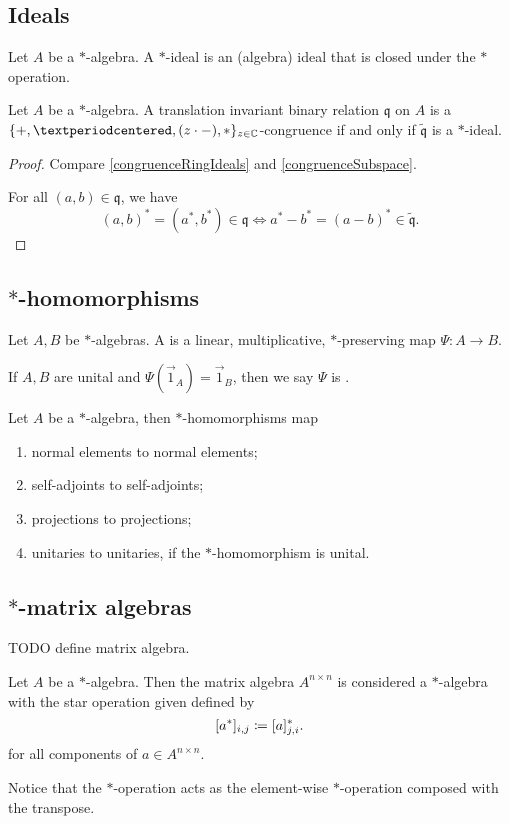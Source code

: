 \subsection{Ideals}
\begin{definition}
Let $A$ be a $*$-algebra. A $*$-ideal is an (algebra) ideal that is closed under the $*$ operation.
\end{definition}

\begin{lemma} \label{starIdealCongruence}
Let $A$ be a $*$-algebra. A translation invariant binary relation $\mathfrak{q}$ on $A$ is a
$\{+, ·, (z\cdot -), *\}_{z\in \C}$-congruence if and only if $\widetilde{\mathfrak{q}}$ is a $*$-ideal.
\end{lemma}
\begin{proof}
Compare \ref{congruenceRingIdeals} and \ref{congruenceSubspace}.

For all $(a,b)\in \mathfrak{q}$, we have
\[ (a,b)^* = (a^*, b^*) \in \mathfrak{q} \iff a^* - b^* = (a-b)^*\in \widetilde{\mathfrak{q}}. \]
\end{proof}

\subsection{$*$-homomorphisms}
\begin{definition}
Let $A,B$ be $*$-algebras. A  is a linear, multiplicative, $*$-preserving map $\Psi: A \to B$.

If $A,B$ are unital and $\Psi(\vec{1}_A) = \vec{1}_B$, then we say $\Psi$ is .
\end{definition}
\begin{lemma}
Let $A$ be a $*$-algebra, then $*$-homomorphisms map
\begin{enumerate}
\item normal elements to normal elements;
\item self-adjoints to self-adjoints;
\item projections to projections;
\item unitaries to unitaries, if the $*$-homomorphism is unital.
\end{enumerate}
\end{lemma}

\subsection{$*$-matrix algebras}
TODO define matrix algebra.
\begin{definition}
Let $A$ be a $*$-algebra. Then the matrix algebra $A^{n\times n}$ is considered a $*$-algebra with the star operation given defined by
\[ [a^*]_{i,j} \coloneqq [a]_{j,i}^*. \]
for all components of $a\in A^{n\times n}$.
\end{definition}
Notice that the $*$-operation acts as the element-wise $*$-operation composed with the transpose.
